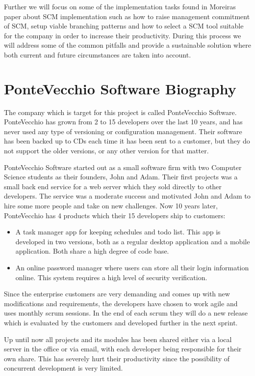 \documentclass[10pt]{article}
\begin{document}
\noindent Further we will focus on some of the implementation tasks found in Moreiras \cite{Moreira} paper about SCM implementation such as how to raise management commitment of SCM, setup viable branching patterns and how to select a SCM tool suitable for the company in order to increase their productivity. During this process we will address some of the common pitfalls and provide a sustainable solution where both current and future circumstances are taken into account.

\section{PonteVecchio Software Biography}
The company which is target for this project is called PonteVecchio Software. PonteVecchio has grown from 2 to 15 developers over the last 10 years, and has never used any type of versioning or configuration management. Their software has been backed up to CDs each time it has been sent to a customer, but they do not support the older versions, or any other version for that matter.

\noindent PonteVecchio Software started out as a small software firm with two Computer Science students as their founders, John and Adam. Their first projects was a small back end service for a web server which they sold directly to other developers. The service was a moderate success and motivated John and Adam to hire some more people and take on new challenges. Now 10 years later, PonteVecchio has 4 products which their 15 developers ship to customers:
\begin{itemize}
\item A task manager app for keeping schedules and todo list. This app is developed in two versions, both as a regular desktop application and a mobile application. Both share a high degree of code base. 
\item An online password manager where users can store all their login information online. This system requires a high level of security verification.
\end{itemize}

\noindent Since the enterprise customers are very demanding and comes up with new modifications and requirements, the developers have chosen to work agile and uses monthly scrum sessions. In the end of each scrum they will do a new release which is evaluated by the customers and developed further in the next sprint.

\noindent Up until now all projects and its modules has been shared either via a local server in the office or via email, with each developer being responsible for their own share. This has severely hurt their productivity since the possibility of concurrent development is very limited. 
\end{document}
